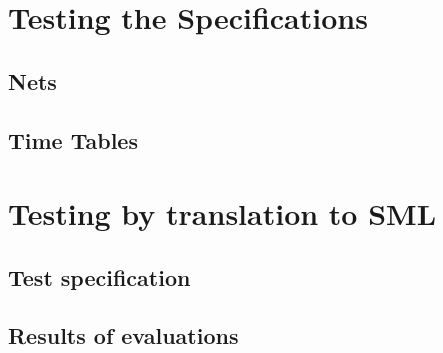 \documentclass[a4]{article}
\begin{document}
\section{Testing the Specifications}

\subsection{Nets}



\subsection{Time Tables}



\section{Testing by translation to SML}

\subsection{Test specification}

\subsection{Results of evaluations}
\end{document}

